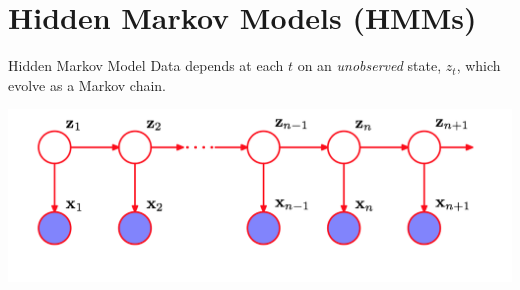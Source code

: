 \documentclass[11pt, mathserif, handout, table]{beamer}
\begin{document}


\section{Hidden Markov Models (HMMs)}

\begin{frame}{Hidden Markov Model}
Data depends at each $t$ on an {\em unobserved} state, $z_t$, which
evolve as a Markov chain.
\begin{center}
\includegraphics[width=\textwidth]{img/hmm_bishop.png}
\end{center}
\end{frame}
\end{document}
